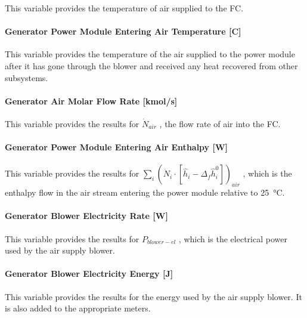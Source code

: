 This variable provides the temperature of air supplied to the FC.

\paragraph{Generator Power Module Entering Air Temperature {[}C{]}}\label{generator-power-module-entering-air-temperature-c}

This variable provides the temperature of the air supplied to the power module after it has gone through the blower and received any heat recovered from other subsystems.

\paragraph{Generator Air Molar Flow Rate {[}kmol/s{]}}\label{generator-air-molar-flow-rate-kmols}

This variable provides the results for \({\dot N_{air}}\) , the flow rate of air into the FC.

\paragraph{Generator Power Module Entering Air Enthalpy {[}W{]}}\label{generator-power-module-entering-air-enthalpy-w}

This variable provides the results for \({\sum\limits_i {\left( {{{\dot N}_i} \cdot \left[ {{{\hat h}_i} - {\Delta_f}\hat h_i^0} \right]} \right)}_{air}}\) , which is the enthalpy flow in the air stream entering the power module relative to \SI{25}{\celsius}.

\paragraph{Generator Blower Electricity Rate {[}W{]}}\label{generator-blower-electric-power-w}

This variable provides the results for \({P_{blower - el}}\) , which is the electrical power used by the air supply blower.

\paragraph{Generator Blower Electricity Energy {[}J{]}}\label{generator-blower-electric-energy-j}

This variable provides the results for the energy used by the air supply blower. It is also added to the appropriate meters.

